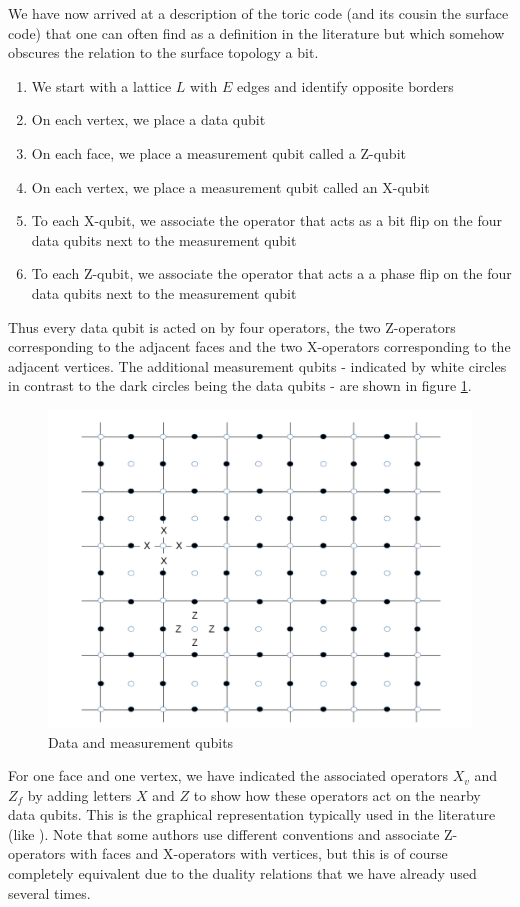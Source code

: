 \documentclass[a4paper, draft]{article}
\theoremstyle{own}
\theoremstyle{remark}
\begin{document}
We have now arrived at a description of the toric code (and its cousin the surface code) that one can often find as a definition in the literature but which somehow obscures the relation to the surface topology a bit.
\begin{enumerate}
	\item We start with a lattice $L$ with $E$ edges and identify opposite borders
	\item On each vertex, we place a data qubit
	\item On each face, we place a measurement qubit called a Z-qubit
	\item On each vertex, we place a measurement qubit called an X-qubit
	\item To each X-qubit, we associate the operator that acts as a bit flip on the four data qubits next to the measurement qubit
	\item To each Z-qubit, we associate the operator that acts a a phase flip on the four data qubits  next to the measurement qubit
\end{enumerate}

Thus every data qubit is acted on by four operators, the two Z-operators corresponding to the adjacent faces and the two X-operators corresponding to the adjacent vertices. The additional measurement qubits - indicated by white circles in contrast to the dark circles being the data qubits - are shown in figure \ref{fig:ToricCodeMeasurementQubits}.

\begin{figure}[ht]
\centering
\includegraphics[width=0.7\linewidth]{images/ToricCodeMeasurementQubits}
\caption[Data and measurement qubits]{Data and measurement qubits}
\label{fig:ToricCodeMeasurementQubits}
\end{figure}

For one face and one vertex, we have indicated the associated operators $X_v$ and $Z_f$ by adding letters $X$ and $Z$ to show how these operators act on the nearby data qubits. This is the graphical representation typically used in the literature (like \cite{SurfaceCodes}). Note that some authors use different conventions and associate Z-operators with faces and X-operators with vertices, but this is of course completely equivalent due to the duality relations that we have already used several times.
\end{document}
